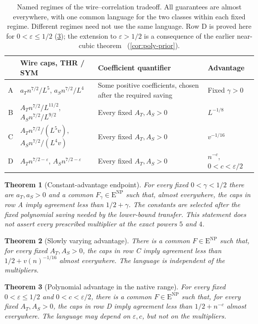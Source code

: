 \documentclass[11pt,letterpaper]{article}
\newtheorem{theorem}{Theorem}[section]
\theoremstyle{definition}
\theoremstyle{remark}
\newcommand{\ENP}{\mathrm{E}^{\mathrm{NP}}}
\begin{document}
\begin{table}[ht]
\centering
\begin{tabular}{@{}c p{} p{} p{}@{}}
\toprule
 & Wire caps, THR / SYM & Coefficient quantifier & Advantage\\
\midrule
A & $a_T n^{7/2}/L^5$, $a_S n^{7/2}/L^4$
  & Some positive coefficients, chosen after the required saving
  & Fixed $\gamma>0$\\[3pt]
B & $A_T n^{7/2}/L^{11/2}$, $A_S n^{7/2}/L^{9/2}$
  & Every fixed $A_T,A_S>0$ & $L^{-1/8}$\\[3pt]
C & $A_T n^{7/2}/(L^5v)$, $A_S n^{7/2}/(L^4v)$
  & Every fixed $A_T,A_S>0$ & $v^{-1/16}$\\[3pt]
D & $A_T n^{7/2-\varepsilon}$, $A_S n^{7/2-\varepsilon}$
  & Every fixed $A_T,A_S>0$ & $n^{-c}$, $0<c<\varepsilon/2$\\
\bottomrule
\end{tabular}
\caption{Named regimes of the wire--correlation tradeoff. All guarantees
are almost everywhere, with one common language for the two classes
within each fixed regime. Different regimes need not use the same language.
Row D is proved here for $0<\varepsilon\le1/2$
(\cref{thm:poly}); the extension to $\varepsilon>1/2$ is a consequence
of the earlier near-cubic theorem~\cite[Theorem~2.3]{NagCubic}
(\cref{cor:poly-prior}).}
\label{tab:regimes}
\end{table}

\begin{theorem}[Constant-advantage endpoint]
\label{thm:endpoint}
For every fixed $0<\gamma<1/2$ there are $a_T,a_S>0$ and a common
$F_\gamma\in\ENP$ such that, almost everywhere, the caps in row A
imply agreement less than $1/2+\gamma$. The constants are selected after
the fixed polynomial saving needed by the lower-bound transfer.
This statement does not assert every prescribed multiplier at the exact
powers $5$ and $4$.
\end{theorem}

\begin{theorem}[Slowly varying advantage]
\label{thm:slow}
There is a common $F\in\ENP$ such that, for every fixed $A_T,A_S>0$,
the caps in row C imply agreement less than $1/2+v(n)^{-1/16}$ almost
everywhere. The language is independent of the multipliers.
\end{theorem}

\begin{theorem}[Polynomial advantage in the native range]
\label{thm:poly}
For every fixed $0<\varepsilon\le1/2$ and $0<c<\varepsilon/2$, there is a
common $F\in\ENP$ such that, for every fixed $A_T,A_S>0$, the caps
in row D imply agreement less than $1/2+n^{-c}$ almost everywhere.
The language may depend on $\varepsilon,c$, but not on the multipliers.
\end{theorem}
\end{document}
